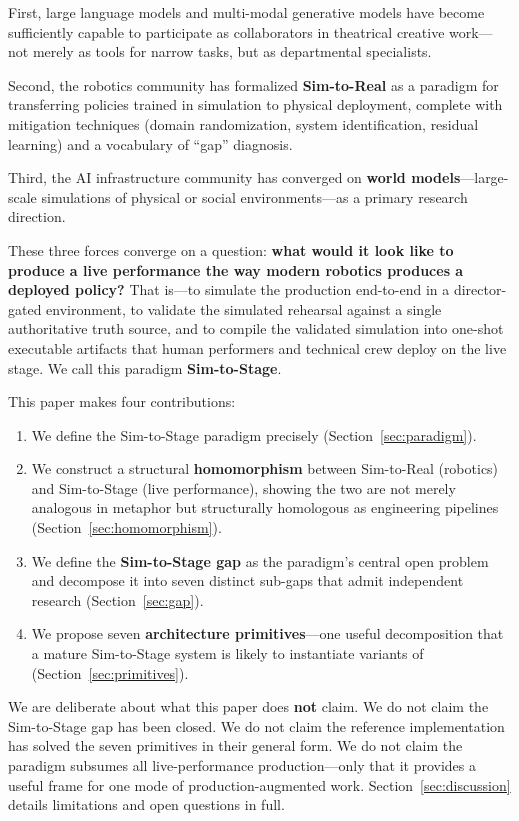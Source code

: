\documentclass[11pt]{article}
\begin{document}
First, large language models and multi-modal generative models have become
sufficiently capable to participate as collaborators in theatrical creative
work---not merely as tools for narrow tasks, but as departmental specialists.

Second, the robotics community has formalized \textbf{Sim-to-Real} as a
paradigm for transferring policies trained in simulation to physical
deployment, complete with mitigation techniques (domain randomization,
system identification, residual learning) and a vocabulary of ``gap''
diagnosis.

Third, the AI infrastructure community has converged on \textbf{world
models}---large-scale simulations of physical or social environments---as
a primary research direction.

These three forces converge on a question: \textbf{what would it look like
to produce a live performance the way modern robotics produces a deployed
policy?}  That is---to simulate the production end-to-end in a
director-gated environment, to validate the simulated rehearsal against a
single authoritative truth source, and to compile the validated simulation
into one-shot executable artifacts that human performers and technical crew
deploy on the live stage.  We call this paradigm \textbf{Sim-to-Stage}.

This paper makes four contributions:

\begin{enumerate}
\item We define the Sim-to-Stage paradigm precisely
      (Section~\ref{sec:paradigm}).
\item We construct a structural \textbf{homomorphism} between Sim-to-Real
      (robotics) and Sim-to-Stage (live performance), showing the two are
      not merely analogous in metaphor but structurally homologous as
      engineering pipelines (Section~\ref{sec:homomorphism}).
\item We define the \textbf{Sim-to-Stage gap} as the paradigm's central
      open problem and decompose it into seven distinct sub-gaps that admit
      independent research (Section~\ref{sec:gap}).
\item We propose seven \textbf{architecture primitives}---one useful
      decomposition that a mature Sim-to-Stage system is likely to
      instantiate variants of (Section~\ref{sec:primitives}).
\end{enumerate}

We are deliberate about what this paper does \textbf{not} claim.  We do
not claim the Sim-to-Stage gap has been closed.  We do not claim the
reference implementation has solved the seven primitives in their general
form.  We do not claim the paradigm subsumes all live-performance
production---only that it provides a useful frame for one mode of
production-augmented work.  Section~\ref{sec:discussion} details
limitations and open questions in full.
\end{document}
